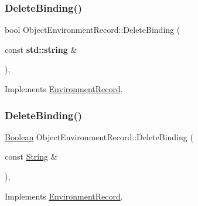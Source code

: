 \subsubsection{\texorpdfstring{Delete\+Binding()}{DeleteBinding()}\hspace{0.1cm}{\footnotesize\ttfamily [1/2]}}
{\footnotesize\ttfamily bool Object\+Environment\+Record\+::\+Delete\+Binding (\begin{DoxyParamCaption}\item[{const \textbf{ std\+::string} \&}]{ }\end{DoxyParamCaption})\hspace{0.3cm}{\ttfamily [final]}, {\ttfamily [virtual]}}



Implements \hyperlink{struct_environment_record_a41079a3969168b9fc4839fd89aa14dc0}{Environment\+Record}.

\mbox{\label{struct_object_environment_record_a86c73af4072c8a60c80ca98113f608fd}} 
\subsubsection{\texorpdfstring{Delete\+Binding()}{DeleteBinding()}\hspace{0.1cm}{\footnotesize\ttfamily [2/2]}}
{\footnotesize\ttfamily \hyperlink{struct_boolean}{Boolean} Object\+Environment\+Record\+::\+Delete\+Binding (\begin{DoxyParamCaption}\item[{const \hyperlink{struct_string}{String} \&}]{ }\end{DoxyParamCaption})\hspace{0.3cm}{\ttfamily [final]}, {\ttfamily [virtual]}}



Implements \hyperlink{struct_environment_record_ac8fe8ad8e0146d5d7e3d9c0f3d873717}{Environment\+Record}.

\mbox{\label{struct_object_environment_record_ad0e2d2c1d5010c81bee1df1988260dc7}} 
